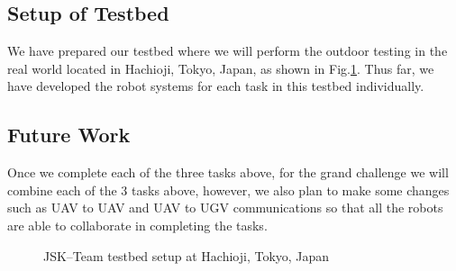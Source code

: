 \documentclass{standalone}
\begin{document}
\subsection{Setup of Testbed}

We have prepared our testbed where we will perform the outdoor testing in the real world located in Hachioji, Tokyo, Japan, as shown in Fig.\ref{fig:objects}. Thus far, we have developed the robot systems for each task in this testbed individually. 

 \subsection{Future Work}
 Once we complete each of the three tasks above, for the grand challenge we will combine each of the 3 tasks above, however, we also plan to make some changes such as UAV to UAV and UAV to UGV communications so that all the robots are able to collaborate in completing the tasks.
 
\begin{figure}[h]
   \newcommand \ilenght{0.1}
   \newcommand \iheight{2.0in}
   \newcommand \iwidth{0.46\textwidth}
   \centering
   \hspace{1.1em}%
   \hspace{1.1em}%
   \hspace{1.1em}%
   \hspace{1.1em}%
   \caption{JSK--Team testbed setup at Hachioji, Tokyo, Japan}
   \label{fig:objects}
 \end{figure}
\end{document}
